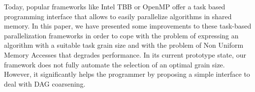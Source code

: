 




Today, popular frameworks like Intel TBB or OpenMP offer a task based programming
interface that allows to easily parallelize algorithms in shared memory.
In this paper, we have presented some improvements to these task-based
parallelization frameworks in order to cope with the problem of expressing an
algorithm with a suitable task grain size and with the problem of Non Uniform Memory
Accesses that degrades performance. In its current prototype state, our framework does not
fully automate the selection of an optimal grain size. However, it
significantly helps the programmer by proposing a simple interface to deal with DAG coarsening.

